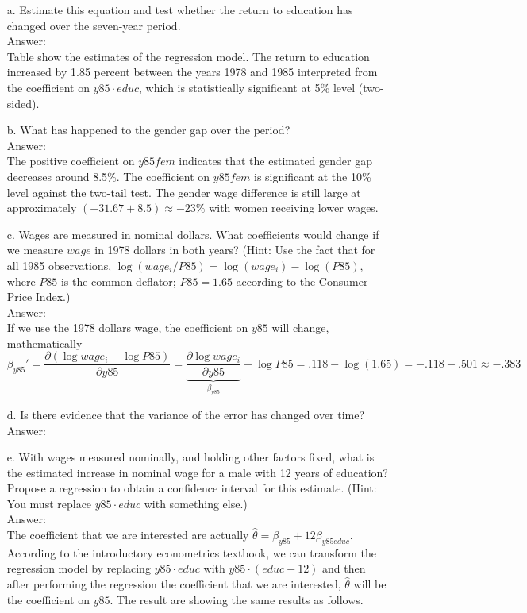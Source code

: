 \documentclass[10pt]{article}
\begin{document}
\begin{enumerate}
\item[a.] Estimate this equation and test whether the return to education has changed over the seven-year period.
\\ Answer: \\
Table show the estimates of the regression model. The return to education increased by 1.85 percent between the years 1978 and 1985 interpreted from the coefficient on $y85\cdot educ$, which is statistically significant at 5\% level (two-sided).\\


\item[b.] What has happened to the gender gap over the period? 
\\ Answer: \\
The positive coefficient on $y85fem$ indicates that the estimated gender gap decreases around 8.5\%. The coefficient on $y85fem$ is significant at the 10\% level against the two-tail test. The gender wage difference is still large at approximately $(-31.67+8.5)\approx -23\%$ with women receiving lower wages.

\item[c.] Wages are measured in nominal dollars. What coefficients would change if we measure $wage$ in 1978 dollars in both years? (Hint: Use the fact that for all 1985 observations, $\log(wage_i/P85)=\log(wage_i)-\log(P85)$, where $P85$ is the common deflator; $P85=1.65$ according to the Consumer Price Index.)
\\ Answer: \\
If we use the 1978 dollars wage, the coefficient on $y85$ will change, mathematically
\[\beta_{y85}'=\frac{\partial (\log{wage_i}-\log{P85})}{\partial y85}=\underbrace{\frac{\partial \log{wage_i}}{\partial y85}}_{\displaystyle \beta_{y85}}-\log{P85}=.118-\log(1.65)=-.118-.501\approx -.383\]

\item[d.] Is there evidence that the variance of the error has changed over time?
\\ Answer: \\


\item[e.] With wages measured nominally, and holding other factors fixed, what is the estimated increase in nominal wage for a male with 12 years of education? Propose a regression to obtain a confidence interval for this estimate. (Hint: You must replace $y85\cdot educ$ with something else.)
\\ Answer: \\
The coefficient that we are interested are actually $\hat{\theta}=\beta_{y85}+12\beta_{y85educ}$. According to the introductory econometrics textbook, we can transform the regression model by replacing $y85\cdot educ$ with $y85\cdot (educ-12)$ and then after performing the regression the coefficient that we are interested, $\hat{\theta}$ will be the coefficient on $y85$. The result are showing the same results as follows.\\


\end{enumerate}
\end{document}
